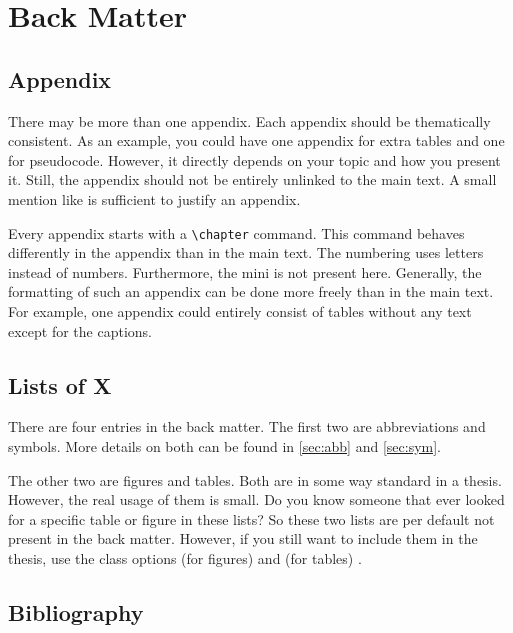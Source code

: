 
\chapter{Back Matter}%
\label{Chapter4}

\section{Appendix}%
\label{sec:app}

There may be more than one appendix. Each appendix should be
thematically consistent. As an example, you could have one appendix for extra
tables and one for pseudocode. However, it directly depends on your topic and
how you present it. Still, the appendix should not be entirely unlinked to the
main text. A small mention like  is sufficient to
justify an appendix.

Every appendix starts with a \verb|\chapter| command. This command behaves
differently in the appendix than in the main text. The numbering uses letters
instead of numbers. Furthermore, the mini  is not present here.
Generally, the formatting of such an appendix can be done more freely than in
the main text.  For example, one appendix could entirely consist of tables
without any text except for the captions.

\section{Lists of X}%
\label{opt:list}

There are four  entries in the back matter. The first two are
abbreviations and symbols. More details on both can be found in
\autoref{sec:abb} and \autoref{sec:sym}.

The other two are figures and tables. Both are in some way standard in a
thesis.  However, the real usage of them is small. Do you know someone that
ever looked for a specific table or figure in these lists? So these two lists
are per default not present in the back matter. However, if you still want to
include them in the thesis, use the class options
 (for figures) and
 (for tables) .

\section{Bibliography}%
\label{sec:bib}

